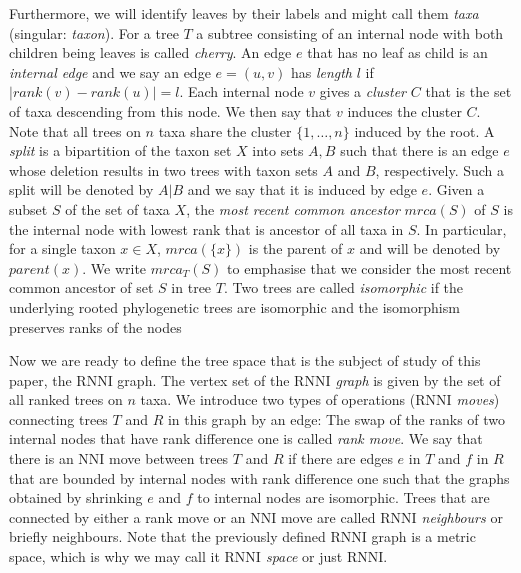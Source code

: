 \documentclass[11pt, a4paper]{article}
\newcommand{\nni}{\mathrm{NNI}}
\newcommand{\rnni}{\mathrm{RNNI}}
\begin{document}
Furthermore, we will identify leaves by their labels and might call them \emph{taxa} (singular: \emph{taxon}).
For a tree $T$ a subtree consisting of an internal node with both children being leaves is called \emph{cherry}.
An edge $e$ that has no leaf as child is an \emph{internal edge} and we say an edge $e=(u,v)$ has \emph{length} $l$ if $|rank(v) - rank(u)| = l$.
Each internal node $v$ gives a \emph{cluster} $C$ that is the set of taxa descending from this node. 
We then say that $v$ induces the cluster $C$.
Note that all trees on $n$ taxa share the cluster $\{1,\ldots,n\}$ induced by the root.
A \emph{split} is a bipartition of the taxon set $X$ into sets $A,B$ such that there is an edge $e$ whose deletion results in two trees with taxon sets $A$ and $B$, respectively.
Such a split will be denoted by $A|B$ and we say that it is induced by edge $e$.
Given a subset $S$ of the set of taxa $X$, the \emph{most recent common ancestor} $mrca(S)$ of $S$ is the internal node with lowest rank that is ancestor of all taxa in $S$. 
In particular, for a single taxon $x \in X$, $mrca(\{x\})$ is the parent of $x$ and will be denoted by $parent(x)$.
We write $mrca_T(S)$ to emphasise that we consider the most recent common ancestor of set $S$ in tree $T$.
Two trees are called \emph{isomorphic} if the underlying rooted phylogenetic trees are isomorphic and the isomorphism preserves ranks of the nodes

Now we are ready to define the tree space that is the subject of study of this paper, the $\rnni$ graph.
The vertex set of the \emph{$\rnni$ graph} is given by the set of all ranked trees on $n$ taxa.
We introduce two types of operations (\emph{$\rnni$ moves}) connecting trees $T$ and $R$ in this graph by an edge:
The swap of the ranks of two internal nodes that have rank difference one is called \emph{rank move}.
We say that there is an $\nni$ move between trees $T$ and $R$ if there are edges $e$ in $T$ and $f$ in $R$ that are bounded by internal nodes with rank difference one such that the graphs obtained by shrinking $e$ and $f$ to internal nodes are isomorphic.
Trees that are connected by either a rank move or an $\nni$ move are called \emph{$\rnni$ neighbours} or briefly neighbours.
Note that the previously defined $\rnni$ graph is a metric space, which is why we may call it \emph{$\rnni$ space} or just $\rnni$.
\end{document}

